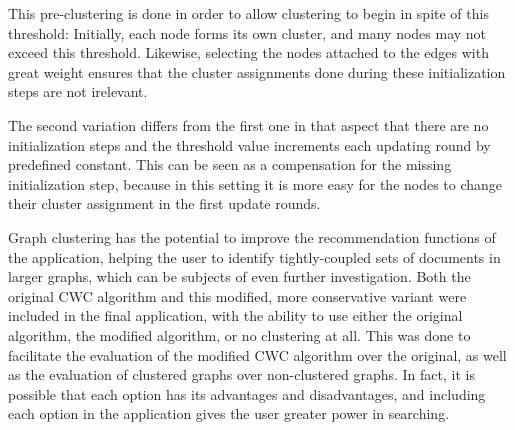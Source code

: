 This pre-clustering is done in order to allow clustering to begin in spite of this threshold: Initially, each node forms its own cluster, and many nodes may not exceed this threshold. Likewise, selecting the nodes attached to the edges with great weight ensures that the cluster assignments done during these initialization steps are not irelevant.

The second variation differs from the first one in that aspect that there are no initialization steps and the threshold value increments each updating round by predefined constant. This can be seen as a compensation for the missing initialization step, because in this setting it is more easy for the nodes to change their cluster assignment in the first update rounds.

Graph clustering has the potential to improve the recommendation functions of the application, helping the user to identify tightly-coupled sets of documents in larger graphs, which can be subjects of even further investigation. Both the original CWC algorithm and this modified, more conservative variant were included in the final application, with the ability to use either the original algorithm, the modified algorithm, or no clustering at all. This was done to facilitate the evaluation of the modified CWC algorithm over the original, as well as the evaluation of clustered graphs over non-clustered graphs. In fact, it is possible that each option has its advantages and disadvantages, and including each option in the application gives the user greater power in searching.
